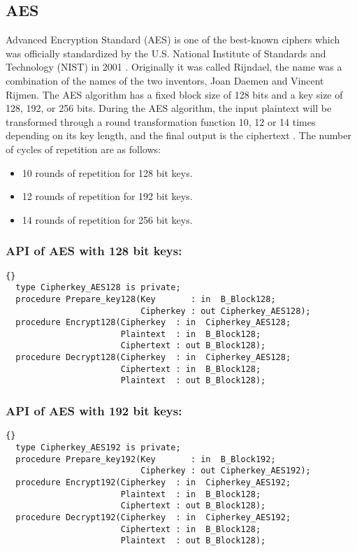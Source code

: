 \subsection{AES}\label{AES}
Advanced Encryption Standard (AES) is one of the best-known ciphers which was officially standardized by the U.S. National Institute of Standards and Technology (NIST) in 2001 \cite{AES-FIPS}.
Originally it was called Rijndael, the name was a combination of the names of the two inventors, Joan Daemen and Vincent Rijmen. The AES algorithm has a fixed block size of 128 bits and a key size of 128, 192, or 256 bits.
During the AES algorithm, the input plaintext will be transformed through a round transformation function 10, 12 or 14 times depending on its key length, and the final output is the ciphertext \cite{AES-FIPS}. The number of cycles of repetition are as follows:
\begin{itemize}
\item 10 rounds of repetition for 128 bit keys.
\item 12 rounds of repetition for 192 bit keys.
\item 14 rounds of repetition for 256 bit keys.
\end{itemize}
\subsubsection*{API of AES with 128 bit keys:}
\begin{lstlisting}{}
  type Cipherkey_AES128 is private;
  procedure Prepare_key128(Key       : in  B_Block128;
                           Cipherkey : out Cipherkey_AES128);                           
  procedure Encrypt128(Cipherkey  : in  Cipherkey_AES128;
                       Plaintext  : in  B_Block128;
                       Ciphertext : out B_Block128);                        
  procedure Decrypt128(Cipherkey  : in  Cipherkey_AES128;
                       Ciphertext : in  B_Block128;
                       Plaintext  : out B_Block128);
\end{lstlisting}
\subsubsection*{API of AES with 192 bit keys:}
\begin{lstlisting}{}
  type Cipherkey_AES192 is private;
  procedure Prepare_key192(Key       : in  B_Block192;
                           Cipherkey : out Cipherkey_AES192);
  procedure Encrypt192(Cipherkey  : in  Cipherkey_AES192;
                       Plaintext  : in  B_Block128;
                       Ciphertext : out B_Block128);
  procedure Decrypt192(Cipherkey  : in  Cipherkey_AES192;
                       Ciphertext : in  B_Block128;
                       Plaintext  : out B_Block128);
\end{lstlisting}
\newpage
